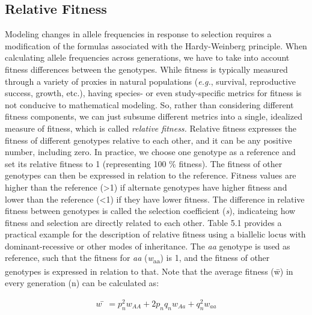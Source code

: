 \documentclass[
]{book}
\begin{document}
\hypertarget{relative-fitness}{%
\subsection{Relative Fitness}\label{relative-fitness}}

Modeling changes in allele frequencies in response to selection requires a modification of the formulas associated with the Hardy-Weinberg principle. When calculating allele frequencies across generations, we have to take into account fitness differences between the genotypes. While fitness is typically measured through a variety of proxies in natural populations (\emph{e.g.}, survival, reproductive success, growth, etc.), having species- or even study-specific metrics for fitness is not conducive to mathematical modeling. So, rather than considering different fitness components, we can just subsume different metrics into a single, idealized measure of fitness, which is called \emph{relative fitness.} Relative fitness expresses the fitness of different genotypes relative to each other, and it can be any positive number, including zero. In practice, we choose one genotype as a reference and set its relative fitness to 1 (representing 100 \% fitness). The fitness of other genotypes can then be expressed in relation to the reference. Fitness values are higher than the reference (\textgreater1) if alternate genotypes have higher fitness and lower than the reference (\textless1) if they have lower fitness. The difference in relative fitness between genotypes is called the selection coefficient (\emph{s}), indicateing how fitness and selection are directly related to each other. Table 5.1 provides a practical example for the description of relative fitness using a biallelic locus with dominant-recessive or other modes of inheritance. The \emph{aa} genotype is used as reference, such that the fitness for \emph{aa} (\emph{w}\textsubscript{aa}) is 1, and the fitness of other genotypes is expressed in relation to that. Note that the average fitness (w̄) in every generation (n) can be calculated as:

\begin{align} 
w̄=p_n^2w_{AA}+2p_nq_nw_{Aa}+q_n^2w_{aa} \label{eq:8}
\end{align}
\end{document}
